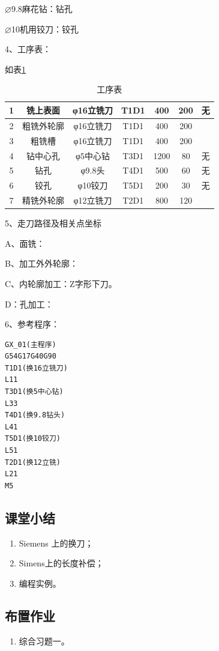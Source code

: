 $\varnothing$9.8麻花钻：钻孔

$\varnothing$10机用铰刀：铰孔

4、工序表：

如表\ref{biao:1}

\begin{table}[h]
	\centering
	\caption[表]{工序表}
	\label{biao:1}
\begin{tabular}{|c|c|c|c|c|c|c|}
	\hline 
	1&铣上表面&φ16立铣刀&T1D1&400&200&无\\ 
	\hline 
	2&粗铣外轮廓&φ16立铣刀&T1D1&400&200&\\ 
	\hline
	3&粗铣槽&φ16立铣刀&T1D1&400&200&\\ 
	\hline
	4&钻中心孔&φ5中心钻&T3D1&1200&80&无\\ 
	\hline
	5&钻孔&φ9.8头&T4D1&500&60&无\\ 
	\hline
	6&铰孔&φ10铰刀&T5D1&200&30&无\\ 
	\hline
	7&精铣外轮廓&φ12立铣刀&T2D1&800&120&\\ 
	\hline 
\end{tabular} 
\end{table}

5、走刀路径及相关点坐标

A、面铣： 

B、加工外外轮廓： 

C、内轮廓加工：Z字形下刀。

D：孔加工：

6、参考程序：

\begin{lstlisting}
GX_01(主程序)
G54G17G40G90
T1D1(换16立铣刀)
L11
T3D1(换5中心钻)
L33
T4D1(换9.8钻头)
L41
T5D1(换10铰刀)
L51
T2D1(换12立铣)
L21
M5
\end{lstlisting}


\subsection{课堂小结}
\begin{enumerate}[1、]
\item Siemens 上的换刀；
\item Simens上的长度补偿；
\item 编程实例。
\end{enumerate}

\vfill
\subsection{布置作业}
\begin{enumerate}[1、]
\item 综合习题一。
\end{enumerate}
\vfill